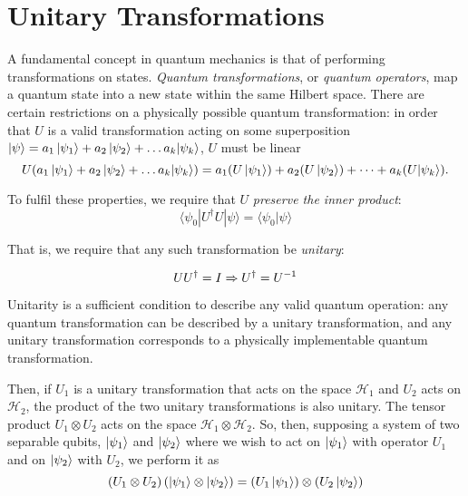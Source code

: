\section{Unitary Transformations}\label{sec:unitary}
A fundamental concept in quantum mechanics is that of performing transformations on states. 
\emph{Quantum transformations}, or \emph{quantum operators}, map a quantum state into a new state within the same Hilbert space. 
There are certain restrictions on a physically possible quantum transformation: in order that $U$ is a valid transformation acting on some superposition $\ket{\psi} = a_1\ket{\psi_1} + a_2 \ket{\psi_2} + \dots a_k|\psi_k\rangle $, $U$ must be linear 
\begin{equation}
    U (  a_1\ket{\psi_1} + a_2 \ket{\psi_2} + \dots a_k|\psi_k\rangle ) =  a_1 (U\ket{\psi_1}) + a_2 (U\ket{\psi_2}) + \dots + a_k (U|\psi_k\rangle).
\end{equation}


To fulfil these properties, we require that $U$ \emph{preserve the inner product}:
$$ \langle \psi_0 | U^{\dag}U | \psi \rangle = \langle \psi_0 | \psi \rangle $$

That is, we require that any such transformation be \emph{unitary}:

\begin{equation}  \label{unitary condition}
UU^{\dag} = I \\
\Rightarrow U^{\dag} = U^{-1}
\end{equation}

Unitarity is a sufficient condition to describe any valid quantum operation: any quantum transformation can be described by a unitary transformation, 
    and any unitary transformation corresponds to a physically implementable quantum transformation. %

Then, if $U_1$ is a unitary transformation that acts on the space $\mathcal{H}_1$ and $U_2$ acts on $\mathcal{H}_2$, the product of the two unitary transformations is also unitary. 
The tensor product $U_1 \otimes U_2$ acts on the space $\mathcal{H}_1 \otimes \mathcal{H}_2$. 
So, then, supposing a system of two separable qubits, $\ket{\psi_1} $ and $\ket{\psi_2} $ where we wish to act on $\ket{\psi_1} $ with operator $U_1$ and on $\ket{\psi_2} $ with $U_2$, 
    we perform it as
\begin{equation}
    \left( U_1 \otimes U_2 \right) \left(\ket{\psi_1} \otimes \ket{\psi_2} \right) = \left(U_1\ket{\psi_1}\right) \otimes \left(U_2 \ket{\psi_2}\right)
\end{equation}

